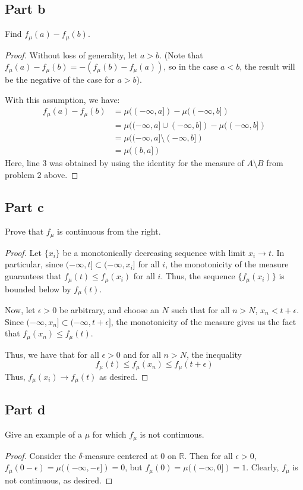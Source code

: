 \documentclass[fontsize=11pt]{scrartcl} %
\numberwithin{equation}{section} %
\numberwithin{figure}{section} %
\numberwithin{table}{section} %
\newcommand{\R}{\mathbb{R}}
\begin{document}
\subsection*{Part b}
Find $f_{\mu}(a) - f_{\mu}(b)$.
\\
\begin{proof}
Without loss of generality, let $a>b$. (Note that $f_{\mu}(a) - f_{\mu}(b) = -(f_{\mu}(b) - f_{\mu}(a))$,
so in the case $a<b$, the result will be the negative of the case for $a>b$).

With this assumption, we have:
\[
\begin{aligned}
f_{\mu}(a) - f_{\mu}(b) &= \mu((-\infty, a]) - \mu((-\infty, b])\\
                        &= \mu((-\infty, a]\cup(-\infty,b]) - \mu((-\infty,b])\\
                        &= \mu((-\infty, a]\setminus (-\infty,b])\\
                        &= \mu((b,a])
\end{aligned}
\]
Here, line 3 was obtained by using the identity for the measure of $A\setminus B$ from
problem 2 above.
\end{proof}

\subsection*{Part c}
Prove that $f_{\mu}$ is continuous from the right.
\\
\begin{proof}
Let $\{x_i\}$ be a monotonically decreasing sequence with limit $x_i\to t$.
In particular, since $(-\infty,t]\subset (-\infty,x_i]$ for all $i$, the monotonicity
of the measure guarantees that $f_{\mu}(t)\leq f_{\mu}(x_i)$ for all $i$. Thus, the
sequence $\{f_{\mu}(x_i)\}$ is bounded below by $f_{\mu}(t)$.

Now, let $\epsilon > 0$  be arbitrary, and choose an $N$ such that for all $n>N$, $x_n < t+\epsilon$.
Since $(-\infty,x_n]\subset(-\infty,t+\epsilon]$, the monotonicity of the measure gives us
the fact that $f_{\mu}(x_n)\leq f_{\mu}(t)$.

Thus, we have that for all $\epsilon > 0$ and for all $n>N$, the inequality
\[
f_{\mu}(t)\leq f_{\mu}(x_n)\leq f_{\mu}(t+\epsilon)
\]
Thus, $f_{\mu}(x_i)\to f_{\mu}(t)$ as desired.
\end{proof}

\subsection*{Part d}
Give an example of a $\mu$ for which $f_{\mu}$ is not continuous.
\\
\begin{proof} %
Consider the $\delta$-measure centered at $0$ on $\R$. Then for all $\epsilon > 0$,
$f_{\mu}(0-\epsilon) = \mu((-\infty,-\epsilon]) = 0$, but $f_{\mu}(0) = \mu((-\infty,0])=1$.
Clearly, $f_{\mu}$ is not continuous, as desired.
\end{proof}
\end{document}
